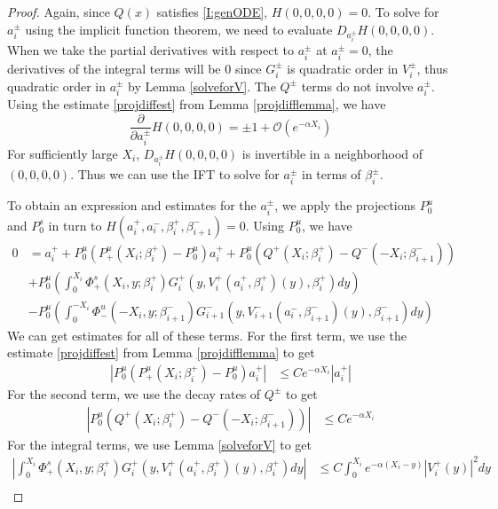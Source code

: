 \documentclass[thesis.tex]{subfiles}
\begin{document}
\begin{lemma}
\begin{proof}
Again, since $Q(x)$ satisfies \eqref{I:genODE}, $H(0, 0, 0, 0) = 0$. To  solve for $a_i^\pm$ using the implicit function theorem, we need to evaluate $D_{a_i^\pm} H(0, 0, 0, 0)$. When we take the partial derivatives with respect to $a_i^\pm$ at $a_i^\pm = 0$, the derivatives of the integral terms will be 0 since $G_i^\pm$ is quadratic order in $V_i^\pm$, thus quadratic order in $a_i^\pm$ by Lemma \ref{solveforV}. The $Q^\pm$ terms do not involve $a_i^\pm$. Using the estimate \eqref{projdiffest} from Lemma \ref{projdifflemma}, we have 
\[
\frac{\partial}{\partial a_i^\pm} H(0, 0, 0, 0) = \pm 1 + \mathcal{O} (e^{-\alpha X_i})
\]
For sufficiently large $X_i$, $D_{a_i^\pm} H(0, 0, 0, 0)$ is invertible in a neighborhood of $(0, 0, 0, 0)$. Thus we can use the IFT to solve for $a_i^\pm$ in terms of $\beta_i^\pm$. 

To obtain an expression and estimates for the $a_i^\pm$, we apply the projections $P^u_0$ and $P^s_0$ in turn to $H(a_i^+, a_i^-, \beta_i^+, \beta_{i+1}^-) = 0$. Using $P^u_0$, we have
\begin{equation}\label{Ps0aiplus}
\begin{aligned}
0 &= a_i^+ + P^u_0(P^u_+(X_i; \beta_i^+) -  P^u_0)a_i^+ 
+ P^u_0 \left( Q^+(X_i; \beta_i^+) - Q^-(-X_i; \beta_{i+1}^-) \right)\\
&+ P^u_0 \left( \int_0^{X_i} \Phi_+^s(X_i, y; \beta_i^+) G_i^+(y, V_i^+(a_i^+, \beta_i^+)(y),\beta_i^+)dy \right) \\
&- P^u_0 \left( \int_0^{-X_i} \Phi_-^u(-X_i, y; \beta_{i+1}^-) G_{i+1}^-(y, V_{i+1}^-(a_i^-, \beta_{i+1}^-)(y),\beta_{i+1}^-) dy \right)
\end{aligned}
\end{equation}
We can get estimates for all of these terms. For the first term, we use the estimate \eqref{projdiffest} from Lemma \ref{projdifflemma} to get 
\begin{align*}
|P^u_0(P^u_+(X_i; \beta_i^+) -  P^u_0)a_i^+ | &\leq C e^{-\alpha X_i} |a_i^+|
\end{align*}
For the second term, we use the decay rates of $Q^\pm$ to get
\begin{align*}
|P^u_0 \left( Q^+(X_i; \beta_i^+) - Q^-(-X_i; \beta_{i+1}^-)  \right)| &\leq C e^{-\alpha X_i}
\end{align*}
For the integral terms, we use Lemma \ref{solveforV} to get
\begin{align*}
\left| \int_0^{X_i} \Phi_+^s(X_i, y; \beta_i^+) G_i^+(y, V_i^+(a_i^+, \beta_i^+)(y),\beta_i^+)dy \right| &\leq C \int_0^{X_i}e^{-\alpha(X_i - y)} |V_i^+(y)|^2 dy \\

\end{align*}
\end{proof}
\end{lemma}
\end{document}
